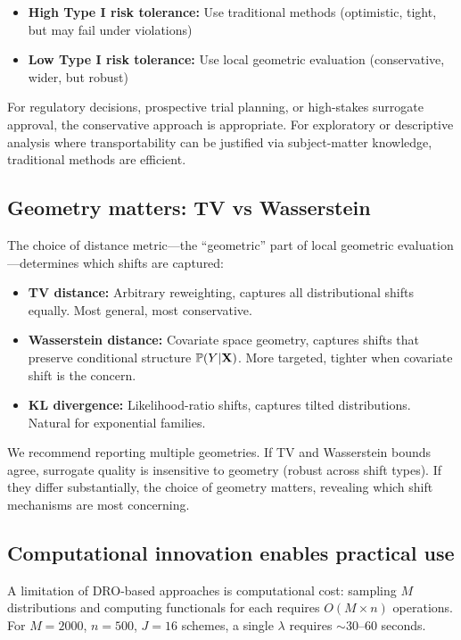 \documentclass{article}
\newcommand{\PP}{\mathbb{P}}
\begin{document}
\begin{itemize}
    \item \textbf{High Type I risk tolerance:} Use traditional methods (optimistic, tight, but may fail under violations)
    \item \textbf{Low Type I risk tolerance:} Use local geometric evaluation (conservative, wider, but robust)
\end{itemize}

For regulatory decisions, prospective trial planning, or high-stakes surrogate approval, the conservative approach is appropriate. For exploratory or descriptive analysis where transportability can be justified via subject-matter knowledge, traditional methods are efficient.

\subsection{Geometry matters: TV vs Wasserstein}

The choice of distance metric---the ``geometric'' part of local geometric evaluation---determines which shifts are captured:

\begin{itemize}
    \item \textbf{TV distance:} Arbitrary reweighting, captures all distributional shifts equally. Most general, most conservative.
    \item \textbf{Wasserstein distance:} Covariate space geometry, captures shifts that preserve conditional structure $\PP(Y|\bX)$. More targeted, tighter when covariate shift is the concern.
    \item \textbf{KL divergence:} Likelihood-ratio shifts, captures tilted distributions. Natural for exponential families.
\end{itemize}

We recommend reporting multiple geometries. If TV and Wasserstein bounds agree, surrogate quality is insensitive to geometry (robust across shift types). If they differ substantially, the choice of geometry matters, revealing which shift mechanisms are most concerning.

\subsection{Computational innovation enables practical use}

A limitation of DRO-based approaches is computational cost: sampling $M$ distributions and computing functionals for each requires $O(M \times n)$ operations. For $M=2000$, $n=500$, $J=16$ schemes, a single $\lambda$ requires $\sim$30--60 seconds.
\end{document}
